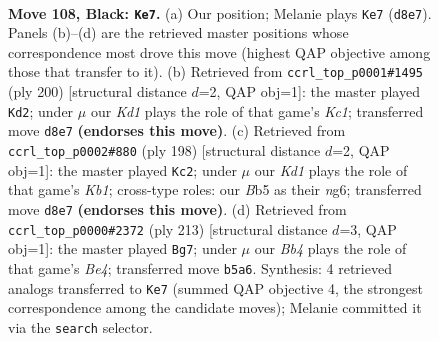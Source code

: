 \documentclass[11pt]{article}
\begin{document}
\clearpage

\begin{figure}[p]\centering
\begin{subfigure}{0.46\textwidth}\centering
\resizebox{\linewidth}{!}{%
\newchessgame
\chessboard[
  setfen={3k3K/8/8/1b3p2/5P2/8/8/8 b - - 31 108},
  showmover=false,
  pgfstyle=straightmove, color=movearrow, markmove={d8-e7}
]}
\caption{}
\end{subfigure}\hfill
\begin{subfigure}{0.46\textwidth}\centering
\resizebox{\linewidth}{!}{%
\newchessgame
\chessboard[
  setfen={4k3/8/8/4p3/8/5P2/B4b2/2K5 w - - 23 101},
  showmover=false,
  pgfstyle=straightmove, color=movearrow, markmove={c1-d2}
]}
\caption{}
\end{subfigure}
\\[4pt]
\begin{subfigure}{0.46\textwidth}\centering
\resizebox{\linewidth}{!}{%
\newchessgame
\chessboard[
  setfen={8/3B4/3p2n1/3P4/1k6/8/8/1K6 w - - 13 100},
  showmover=false,
  pgfstyle=straightmove, color=movearrow, markmove={b1-c2}
]}
\caption{}
\end{subfigure}\hfill
\begin{subfigure}{0.46\textwidth}\centering
\resizebox{\linewidth}{!}{%
\newchessgame
\chessboard[
  setfen={8/8/k7/4b3/2K5/p7/P7/6N1 b - - 71 107},
  showmover=false,
  pgfstyle=straightmove, color=movearrow, markmove={e5-g7}
]}
\caption{}
\end{subfigure}
\caption{\textbf{Move 108, Black: \texttt{Ke7}.} (a) Our position; Melanie plays \texttt{Ke7} (\texttt{d8e7}). Panels (b)--(d) are the retrieved master positions whose correspondence most drove this move (highest QAP objective among those that transfer to it). (b) Retrieved from \texttt{ccrl\_top\_p0001\#1495} (ply 200) [structural distance $d$=2, QAP obj=1]: the master played \texttt{Kd2}; under $\mu$ our \emph{Kd1} plays the role of that game's \emph{Kc1}; transferred move \texttt{d8e7} \textbf{(endorses this move)}. (c) Retrieved from \texttt{ccrl\_top\_p0002\#880} (ply 198) [structural distance $d$=2, QAP obj=1]: the master played \texttt{Kc2}; under $\mu$ our \emph{Kd1} plays the role of that game's \emph{Kb1}; cross-type roles: our \emph{B}b5 as their \emph{n}g6; transferred move \texttt{d8e7} \textbf{(endorses this move)}. (d) Retrieved from \texttt{ccrl\_top\_p0000\#2372} (ply 213) [structural distance $d$=3, QAP obj=1]: the master played \texttt{Bg7}; under $\mu$ our \emph{Bb4} plays the role of that game's \emph{Be4}; transferred move \texttt{b5a6}. Synthesis: 4 retrieved analogs transferred to \texttt{Ke7} (summed QAP objective 4, the strongest correspondence among the candidate moves); Melanie committed it via the \texttt{search} selector.}
\label{fig:thought-m215}
\end{figure}
\end{document}
